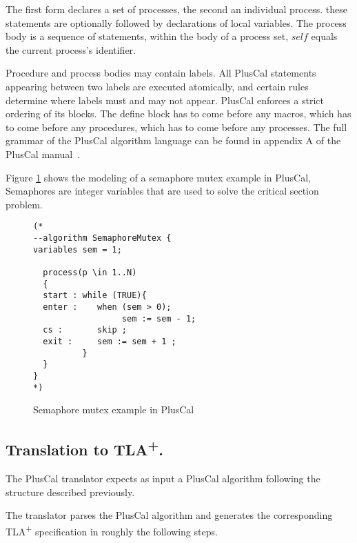 \documentclass{article}
\newcommand{\tlaplus}{TLA\textsuperscript{+}\xspace}
\begin{document}
The first form declares a set of processes, the second an individual process. these statements are optionally followed by declarations of local variables. The process body is a sequence of statements, within the body of a process set, $self$ equals the current process's identifier.

Procedure and process bodies may contain labels. All PlusCal statements appearing between two labels are executed atomically, and certain rules determine where labels must and may not appear.
PlusCal enforces a strict ordering of its blocks. The define block has to come before any macros, which has to come before any procedures, which has to come before any processes. The full grammar of the PlusCal algorithm language can be found in appendix A of the PlusCal manual~\cite{pcalAlgo}.

Figure \ref{semaphoreEx} shows the modeling of a semaphore mutex example in PlusCal, Semaphores are integer variables that are used to solve the critical section problem.


\begin{figure}
\begin{lstlisting}[language=pluscal, frame = tlrb, numbers = none]
(*
--algorithm SemaphoreMutex {
variables sem = 1;
 
  process(p \in 1..N)
  {
  start : while (TRUE){
  enter :    when (sem > 0);
                  sem := sem - 1;            
  cs :       skip ;
  exit :     sem := sem + 1 ;
          }
  }
}
*)
\end{lstlisting}
\caption{Semaphore mutex example in PlusCal}
\label{semaphoreEx}
\end{figure} 

\FloatBarrier
\subsection{Translation to \tlaplus.}
The PlusCal translator expects as input a PlusCal algorithm following the structure described previously.

The translator parses the PlusCal algorithm and generates the corresponding \tlaplus specification in roughly the following steps.
\end{document}
